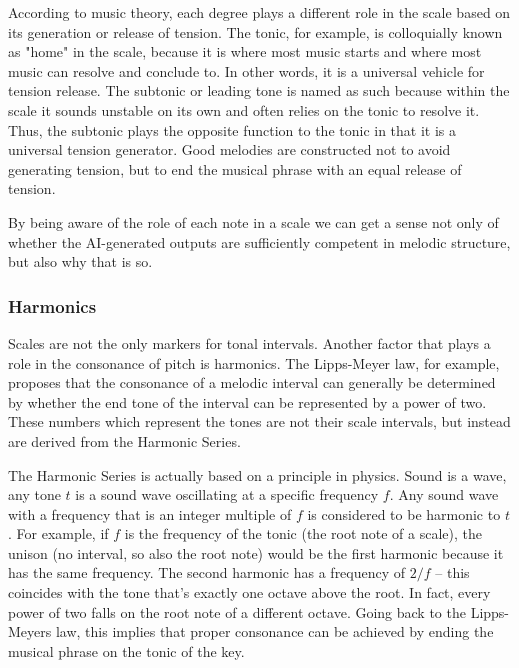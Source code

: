 According to music theory, each degree plays a different role in the scale based on its generation
or release of tension. The tonic, for example, is colloquially known as "home" in the scale,
because it is where most music starts and where most music can resolve and conclude to. In other
words, it is a universal vehicle for tension release. The subtonic or leading tone is named as
such because within the scale it sounds unstable on its own and often relies on the tonic to resolve
it. Thus, the subtonic plays the opposite function to the tonic in that it is a universal tension
generator. Good melodies are constructed not to avoid generating tension, but to end the
musical phrase with an equal release of tension.

By being aware of the role of each note in a scale we can get a sense not only of whether
the AI-generated outputs are sufficiently competent in melodic structure, but also why that is so.

\subsubsection{Harmonics}

Scales are not the only markers for tonal intervals. Another factor that plays a role in the
consonance of pitch is harmonics. The Lipps-Meyer law, for example, proposes that the consonance
of a melodic interval can generally be determined by whether the end tone of the interval
can be represented by a power of two.\autocite{musiciansArithmetic} These numbers which represent
the tones are not their scale intervals, but instead are derived from the Harmonic Series.

The Harmonic Series is actually based on a principle in physics. Sound is a wave, any tone $ t $
is a sound wave oscillating at a specific frequency $ f $. Any sound wave with a frequency
that is an integer multiple of $ f $ is considered to be harmonic to $ t $.\autocite{intervals} For example,
if $ f $ is the frequency of the tonic (the root note of a scale), the unison (no interval,
so also the root note) would be the first harmonic because it has the same frequency. The second
harmonic has a frequency of $ 2/f $ -- this coincides with the tone that's exactly one octave
above the root. In fact, every power of two falls on the root note of a different octave. Going
back to the Lipps-Meyers law, this implies that proper consonance can be achieved by ending the
musical phrase on the tonic of the key.


